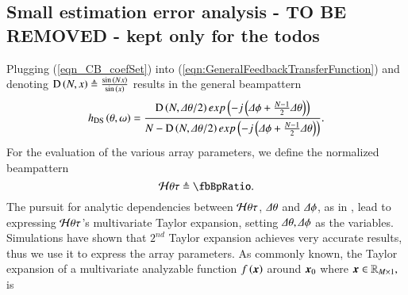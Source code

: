 {
    \subsection*{Small estimation error analysis - \textbf{TO BE REMOVED - kept only for the todos}}
    \label{subsection_ArrayPerformance_TayolrAnalysis}
    Plugging (\ref{eqn_CB_coefSet}) into (\ref{eqn:GeneralFeedbackTransferFunction}) and denoting $\text{D}\left({N,x}\right) \triangleq \frac{\sin{\left({Nx}\right)}}{\sin{\left({x}\right)}}$ results in the general \coefSetName{} beampattern 
    \begin{equation*}
        h_{\text{DS}{}}\left({\theta,\omega}\right)
        =
        \frac{
        \text{D}\left({N,\Delta\theta/2}\right)exp\left({-j\left({\Delta\phi+\frac{N-1}{2}\Delta\theta}\right)}\right)
        }{
        N - \text{D}\left({N,\Delta\theta/2}\right)exp\left({-j\left({\Delta\phi+\frac{N-1}{2}\Delta\theta}\right)}\right)
        }.
    \end{equation*}
    For the evaluation of the various array parameters, we define the normalized beampattern 
    \begin{equation}
        \label{eqn_arrPerformance_beamwidth_3dB}
        \Hr{\theta}{\tau}{}\triangleq\fbBpRatio.
    \end{equation}
    The pursuit for analytic dependencies between $\mathcal{H}{\theta}{\tau}{}$, $\Delta\theta$ and $\Delta\phi$, as in \cite{van2004optimum}, lead to expressing $\mathcal{H}{\theta}{\tau}{}$'s multivariate Taylor expansion, setting $\Delta\theta,\Delta\phi$ as the variables. Simulations have shown that $2^{nd}$ Taylor expansion achieves very accurate results, thus we use it to express the array parameters. As commonly known, the Taylor expansion of a multivariate analyzable function $f\left({\boldsymbol{x}}\right)$ around $\boldsymbol{x}_{0}$ where $\boldsymbol{x} \in \mathbb{R}_{M\times1},$ is 
}
